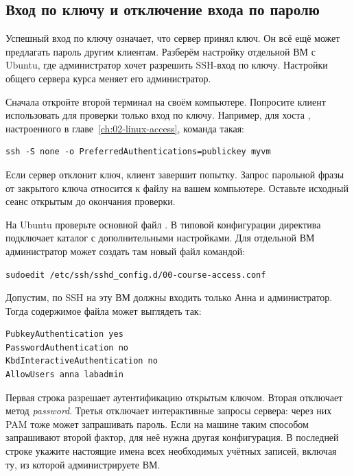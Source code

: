 \subsection{Вход по ключу и отключение входа по паролю}

Успешный вход по ключу означает, что сервер принял ключ. Он всё ещё
может предлагать пароль другим клиентам. Разберём настройку отдельной
ВМ с Ubuntu, где администратор хочет разрешить SSH-вход по ключу.
Настройки общего сервера курса меняет его администратор.

Сначала откройте второй терминал на своём компьютере. Попросите клиент
использовать для проверки только вход по ключу. Например, для хоста
, настроенного в главе~\ref{ch:02-linux-access}, команда такая:

\begin{verbatim}
ssh -S none -o PreferredAuthentications=publickey myvm
\end{verbatim}

Если сервер
отклонит ключ, клиент завершит попытку. Запрос парольной фразы от
закрытого ключа относится к файлу на вашем компьютере.
Оставьте исходный сеанс открытым до окончания проверки.

На Ubuntu проверьте основной файл .
В типовой конфигурации директива  подключает каталог
с дополнительными настройками. Для отдельной ВМ администратор может
создать там новый файл командой:

\begin{verbatim}
sudoedit /etc/ssh/sshd_config.d/00-course-access.conf
\end{verbatim}

Допустим, по SSH на эту ВМ должны входить только Анна и администратор.
Тогда содержимое файла может выглядеть так:

\begin{verbatim}
PubkeyAuthentication yes
PasswordAuthentication no
KbdInteractiveAuthentication no
AllowUsers anna labadmin
\end{verbatim}

Первая строка разрешает аутентификацию открытым ключом. Вторая отключает
метод \emph{password}. Третья отключает интерактивные запросы сервера:
через них PAM тоже может запрашивать пароль. Если на машине таким
способом запрашивают второй фактор, для неё нужна другая конфигурация.
В последней строке укажите настоящие имена всех необходимых учётных
записей, включая ту, из которой администрируете ВМ.


